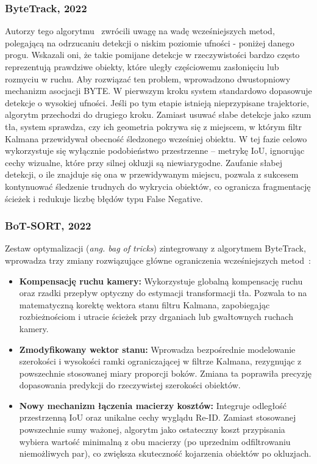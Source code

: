 \subsubsection{ByteTrack, 2022}
Autorzy tego algorytmu~\cite{zhang2022} zwrócili uwagę na wadę wcześniejszych metod, polegającą na
odrzucaniu detekcji o niskim poziomie ufności - poniżej danego progu. Wskazali oni, że takie
pomijane detekcje w rzeczywistości bardzo często reprezentują prawdziwe obiekty, które uległy
częściowemu zasłonięciu lub rozmyciu w ruchu. Aby rozwiązać ten problem, wprowadzono dwustopniowy
mechanizm asocjacji BYTE. W pierwszym kroku system standardowo dopasowuje detekcje o wysokiej
ufności. Jeśli po tym etapie istnieją nieprzypisane trajektorie, algorytm przechodzi do drugiego
kroku. Zamiast usuwać słabe detekcje jako szum tła, system sprawdza, czy ich geometria pokrywa się
z miejscem, w którym filtr Kalmana przewidywał obecność śledzonego wcześniej obiektu. W tej fazie
celowo wykorzystuje się wyłącznie podobieństwo przestrzenne -- metrykę IoU, ignorując cechy
wizualne, które przy silnej okluzji są niewiarygodne. Zaufanie słabej detekcji, o ile znajduje się
ona w przewidywanym miejscu, pozwala z sukcesem kontynuować śledzenie trudnych do wykrycia
obiektów, co ogranicza fragmentację ścieżek i redukuje liczbę błędów typu False Negative.

\subsubsection{BoT-SORT, 2022}
Zestaw optymalizacji (\textit{ang. bag of tricks}) zintegrowany z algorytmem ByteTrack, wprowadza
trzy zmiany rozwiązujące główne ograniczenia wcześniejszych metod~\cite{aharon2022}:
\begin{itemize}
  \item \textbf{Kompensację ruchu kamery:} Wykorzystuje globalną kompensację ruchu oraz rzadki przepływ optyczny do estymacji transformacji tła. Pozwala to na matematyczną korektę wektora stanu filtru Kalmana, zapobiegając rozbieżnościom i utracie ścieżek przy drganiach lub gwałtownych ruchach kamery.
  \item \textbf{Zmodyfikowany wektor stanu:} Wprowadza bezpośrednie modelowanie szerokości i wysokości ramki ograniczającej w filtrze Kalmana, rezygnując z powszechnie stosowanej miary proporcji boków. Zmiana ta poprawiła precyzję dopasowania predykcji do rzeczywistej szerokości obiektów.
  \item \textbf{Nowy mechanizm łączenia macierzy kosztów:} Integruje odległość przestrzenną IoU oraz unikalne cechy wyglądu Re-ID. Zamiast stosowanej powszechnie sumy ważonej, algorytm jako ostateczny koszt przypisania wybiera wartość minimalną z obu macierzy (po uprzednim odfiltrowaniu niemożliwych par), co zwiększa skuteczność kojarzenia obiektów po okluzjach.
\end{itemize}

